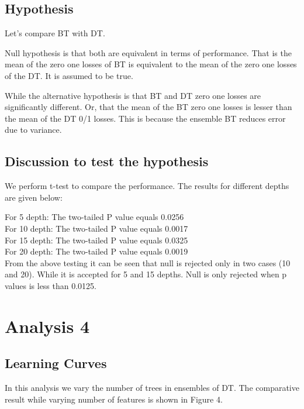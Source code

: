 \documentclass[12pt]{article}
\begin{document}
\subsection{Hypothesis}

Let's compare BT with DT. 

Null hypothesis is that both are equivalent in terms of performance. That is the mean of the
zero one losses of BT is equivalent to the mean of the zero one losses of the DT. It is assumed
to be true. 

While the alternative hypothesis is that BT and DT zero one losses are significantly different.
Or, that the mean of the BT zero one losses is lesser than the mean of the DT 0/1 losses.
This is because the ensemble BT reduces error due to variance.

\subsection{Discussion to test the hypothesis}

We perform t-test to compare the performance. The results for different depths are given below:

For 5 depth:
  The two-tailed P value equals 0.0256   \\

For 10 depth:
  The two-tailed P value equals 0.0017   \\

For 15 depth:
  The two-tailed P value equals 0.0325    \\

For 20 depth:
  The two-tailed P value equals 0.0019   \\

From the above testing it can be seen that null is rejected only in two cases (10 and 20).
While it is accepted for 5 and 15 depths.  Null is only rejected when p values is less than 0.0125.

\section{Analysis 4}

\subsection{Learning Curves}

In this analysis we vary the number of trees in ensembles of DT.
The comparative result while varying number of features is shown in Figure 4.
\end{document}
